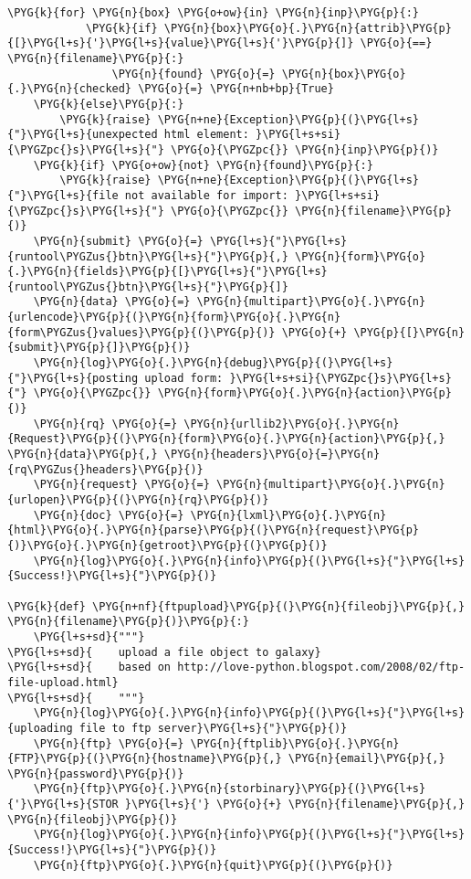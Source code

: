 \begin{Verbatim}[commandchars=\\\{\}]
        \PYG{k}{for} \PYG{n}{box} \PYG{o+ow}{in} \PYG{n}{inp}\PYG{p}{:}
            \PYG{k}{if} \PYG{n}{box}\PYG{o}{.}\PYG{n}{attrib}\PYG{p}{[}\PYG{l+s}{'}\PYG{l+s}{value}\PYG{l+s}{'}\PYG{p}{]} \PYG{o}{==} \PYG{n}{filename}\PYG{p}{:}
                \PYG{n}{found} \PYG{o}{=} \PYG{n}{box}\PYG{o}{.}\PYG{n}{checked} \PYG{o}{=} \PYG{n+nb+bp}{True}
    \PYG{k}{else}\PYG{p}{:}
        \PYG{k}{raise} \PYG{n+ne}{Exception}\PYG{p}{(}\PYG{l+s}{"}\PYG{l+s}{unexpected html element: }\PYG{l+s+si}{\PYGZpc{}s}\PYG{l+s}{"} \PYG{o}{\PYGZpc{}} \PYG{n}{inp}\PYG{p}{)}
    \PYG{k}{if} \PYG{o+ow}{not} \PYG{n}{found}\PYG{p}{:}
        \PYG{k}{raise} \PYG{n+ne}{Exception}\PYG{p}{(}\PYG{l+s}{"}\PYG{l+s}{file not available for import: }\PYG{l+s+si}{\PYGZpc{}s}\PYG{l+s}{"} \PYG{o}{\PYGZpc{}} \PYG{n}{filename}\PYG{p}{)}
    \PYG{n}{submit} \PYG{o}{=} \PYG{l+s}{"}\PYG{l+s}{runtool\PYGZus{}btn}\PYG{l+s}{"}\PYG{p}{,} \PYG{n}{form}\PYG{o}{.}\PYG{n}{fields}\PYG{p}{[}\PYG{l+s}{"}\PYG{l+s}{runtool\PYGZus{}btn}\PYG{l+s}{"}\PYG{p}{]}
    \PYG{n}{data} \PYG{o}{=} \PYG{n}{multipart}\PYG{o}{.}\PYG{n}{urlencode}\PYG{p}{(}\PYG{n}{form}\PYG{o}{.}\PYG{n}{form\PYGZus{}values}\PYG{p}{(}\PYG{p}{)} \PYG{o}{+} \PYG{p}{[}\PYG{n}{submit}\PYG{p}{]}\PYG{p}{)}
    \PYG{n}{log}\PYG{o}{.}\PYG{n}{debug}\PYG{p}{(}\PYG{l+s}{"}\PYG{l+s}{posting upload form: }\PYG{l+s+si}{\PYGZpc{}s}\PYG{l+s}{"} \PYG{o}{\PYGZpc{}} \PYG{n}{form}\PYG{o}{.}\PYG{n}{action}\PYG{p}{)}
    \PYG{n}{rq} \PYG{o}{=} \PYG{n}{urllib2}\PYG{o}{.}\PYG{n}{Request}\PYG{p}{(}\PYG{n}{form}\PYG{o}{.}\PYG{n}{action}\PYG{p}{,} \PYG{n}{data}\PYG{p}{,} \PYG{n}{headers}\PYG{o}{=}\PYG{n}{rq\PYGZus{}headers}\PYG{p}{)}
    \PYG{n}{request} \PYG{o}{=} \PYG{n}{multipart}\PYG{o}{.}\PYG{n}{urlopen}\PYG{p}{(}\PYG{n}{rq}\PYG{p}{)}
    \PYG{n}{doc} \PYG{o}{=} \PYG{n}{lxml}\PYG{o}{.}\PYG{n}{html}\PYG{o}{.}\PYG{n}{parse}\PYG{p}{(}\PYG{n}{request}\PYG{p}{)}\PYG{o}{.}\PYG{n}{getroot}\PYG{p}{(}\PYG{p}{)}
    \PYG{n}{log}\PYG{o}{.}\PYG{n}{info}\PYG{p}{(}\PYG{l+s}{"}\PYG{l+s}{Success!}\PYG{l+s}{"}\PYG{p}{)}

\PYG{k}{def} \PYG{n+nf}{ftpupload}\PYG{p}{(}\PYG{n}{fileobj}\PYG{p}{,} \PYG{n}{filename}\PYG{p}{)}\PYG{p}{:}
    \PYG{l+s+sd}{"""}
\PYG{l+s+sd}{    upload a file object to galaxy}
\PYG{l+s+sd}{    based on http://love-python.blogspot.com/2008/02/ftp-file-upload.html}
\PYG{l+s+sd}{    """}
    \PYG{n}{log}\PYG{o}{.}\PYG{n}{info}\PYG{p}{(}\PYG{l+s}{"}\PYG{l+s}{uploading file to ftp server}\PYG{l+s}{"}\PYG{p}{)}
    \PYG{n}{ftp} \PYG{o}{=} \PYG{n}{ftplib}\PYG{o}{.}\PYG{n}{FTP}\PYG{p}{(}\PYG{n}{hostname}\PYG{p}{,} \PYG{n}{email}\PYG{p}{,} \PYG{n}{password}\PYG{p}{)}
    \PYG{n}{ftp}\PYG{o}{.}\PYG{n}{storbinary}\PYG{p}{(}\PYG{l+s}{'}\PYG{l+s}{STOR }\PYG{l+s}{'} \PYG{o}{+} \PYG{n}{filename}\PYG{p}{,} \PYG{n}{fileobj}\PYG{p}{)}
    \PYG{n}{log}\PYG{o}{.}\PYG{n}{info}\PYG{p}{(}\PYG{l+s}{"}\PYG{l+s}{Success!}\PYG{l+s}{"}\PYG{p}{)}
    \PYG{n}{ftp}\PYG{o}{.}\PYG{n}{quit}\PYG{p}{(}\PYG{p}{)}


\end{Verbatim}
